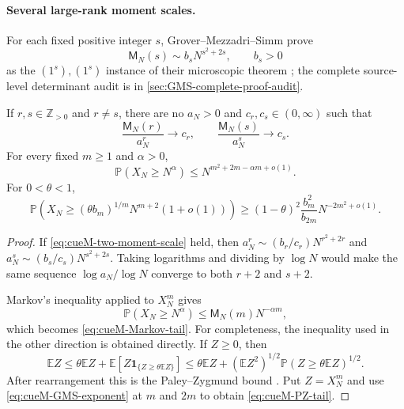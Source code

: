 \paragraph{Several large-rank moment scales.}
For each fixed positive integer $s$, Grover--Mezzadri--Simm prove
\begin{equation}
 \mathsf M_N(s)\sim b_sN^{s^2+2s},\qquad b_s>0
 \label{eq:cueM-GMS-exponent}
\end{equation}
as the $(1^s),(1^s)$ instance of their microscopic theorem
\cite[Thm.~1.2 and Sec.~2]{groverMezzadriSimm2026}; the complete source-level determinant
audit is in \cref{sec:GMS-complete-proof-audit}.

\begin{theorem}
\label{thm:cueM-no-one-scale}
If $r,s\in\mathbb Z_{>0}$ and $r\ne s$, there are no $a_N>0$ and
$c_r,c_s\in(0,\infty)$ such that
\begin{equation}
 \frac{\mathsf M_N(r)}{a_N^r}\longrightarrow c_r,
 \qquad
 \frac{\mathsf M_N(s)}{a_N^s}\longrightarrow c_s.
 \label{eq:cueM-two-moment-scale}
\end{equation}
For every fixed $m\geq1$ and $\alpha>0$,
\begin{equation}
 \mathbb P(X_N\geq N^\alpha)
 \leq N^{m^2+2m-\alpha m+o(1)}.
 \label{eq:cueM-Markov-tail}
\end{equation}
For $0<\theta<1$,
\begin{equation}
 \mathbb P\!\left(
 X_N\geq(\theta b_m)^{1/m}N^{m+2}(1+o(1))
 \right)
 \geq(1-\theta)^2\frac{b_m^2}{b_{2m}}N^{-2m^2+o(1)}.
 \label{eq:cueM-PZ-tail}
\end{equation}
\end{theorem}

\begin{proof}
If \eqref{eq:cueM-two-moment-scale} held, then
$a_N^r\sim(b_r/c_r)N^{r^2+2r}$ and
$a_N^s\sim(b_s/c_s)N^{s^2+2s}$.  Taking logarithms and dividing by $\log N$ would make the
same sequence $\log a_N/\log N$ converge to both $r+2$ and $s+2$.

Markov's inequality applied to $X_N^m$ gives
\[
 \mathbb P(X_N\geq N^\alpha)
 \leq\mathsf M_N(m)N^{-\alpha m},
\]
which becomes \eqref{eq:cueM-Markov-tail}.  For completeness, the inequality used in the
other direction is obtained directly.  If $Z\geq0$, then
\[
 \mathbb EZ\leq\theta\mathbb EZ+
 \mathbb E[Z\mathbf1_{\{Z\geq\theta\mathbb EZ\}}]
 \leq\theta\mathbb EZ+(\mathbb EZ^2)^{1/2}
 \mathbb P(Z\geq\theta\mathbb EZ)^{1/2}.
\]
After rearrangement this is the Paley--Zygmund bound
\cite{paleyZygmund1932}.  Put $Z=X_N^m$ and use
\eqref{eq:cueM-GMS-exponent} at $m$ and $2m$ to obtain
\eqref{eq:cueM-PZ-tail}.
\end{proof}

